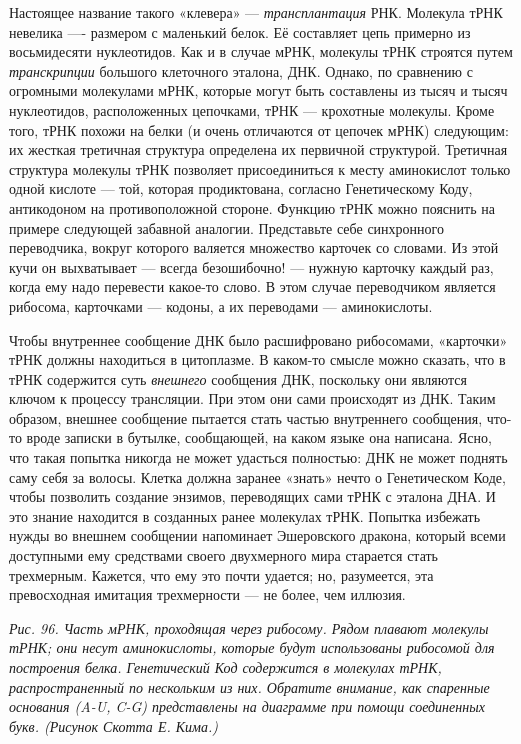 \documentclass[../main.tex]{subfiles}
\begin{document}
Настоящее название такого «клевера» --- \emph{трансплантация} РНК\@. Молекула тРНК невелика ---- размером с маленький белок. Её составляет цепь примерно из восьмидесяти нуклеотидов. Как и в случае мРНК, молекулы тРНК строятся путем \emph{транскрипции} большого клеточного эталона, ДНК\@. Однако, по сравнению с огромными молекулами мРНК, которые могут быть составлены из тысяч и тысяч нуклеотидов, расположенных цепочками, тРНК --- крохотные молекулы. Кроме того, тРНК похожи на белки (и очень отличаются от цепочек мРНК) следующим: их жесткая третичная структура определена их первичной структурой. Третичная структура молекулы тРНК позволяет присоединиться к месту аминокислот только одной кислоте --- той, которая продиктована, согласно Генетическому Коду, антикодоном на противоположной стороне. Функцию тРНК можно пояснить на примере следующей забавной аналогии. Представьте себе синхронного переводчика, вокруг которого валяется множество карточек со словами. Из этой кучи он выхватывает --- всегда безошибочно! --- нужную карточку каждый раз, когда ему надо перевести какое-то слово. В этом случае переводчиком является рибосома, карточками --- кодоны, а их переводами --- аминокислоты.

Чтобы внутреннее сообщение ДНК было расшифровано рибосомами, «карточки» тРНК должны находиться в цитоплазме. В каком-то смысле можно сказать, что в тРНК содержится суть \emph{внешнего} сообщения ДНК, поскольку они являются ключом к процессу трансляции. При этом они сами происходят из ДНК\@. Таким образом, внешнее сообщение пытается стать частью внутреннего сообщения, что-то вроде записки в бутылке, сообщающей, на каком языке она написана. Ясно, что такая попытка никогда не может удасться полностью: ДНК не может поднять саму себя за волосы. Клетка должна заранее «знать» нечто о Генетическом Коде, чтобы позволить создание энзимов, переводящих сами тРНК с эталона ДНА. И это знание находится в созданных ранее молекулах тРНК\@. Попытка избежать нужды во внешнем сообщении напоминает Эшеровского дракона, который всеми доступными ему средствами своего двухмерного мира старается стать трехмерным. Кажется, что ему это почти удается; но, разумеется, эта превосходная имитация трехмерности --- не более, чем иллюзия.

\emph{Рис. 96. Часть мРНК, проходящая через рибосому. Рядом плавают молекулы тРНК; они несут аминокислоты, которые будут использованы рибосомой для построения белка. Генетический Код содержится в молекулах тРНК, распространенный по нескольким из них. Обратите внимание, как спаренные основания (A-U, C-G) представлены на диаграмме при помощи соединенных букв. (Рисунок Скотта Е. Кима.)}
\end{document}
